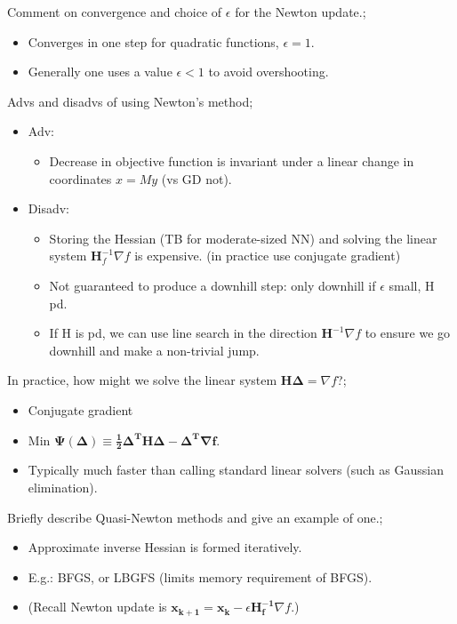 \documentclass{article}
\begin{document}
Comment on convergence and choice of $\epsilon$ for the Newton update.; \begin{itemize} \item Converges in one step for quadratic functions, $\epsilon = 1$.  \item Generally one uses a value $\epsilon < 1$ to avoid overshooting.  \end{itemize}

Advs and disadvs of using Newton's method; \begin{itemize} \item Adv: \begin{itemize} \item Decrease in objective function is invariant under a linear change in coordinates $x=My$ (vs GD not).  \end{itemize} \item Disadv: \begin{itemize} \item Storing the Hessian (TB for moderate-sized NN) and solving the linear system $\mathbf{H}_f^{-1}\nabla f$ is expensive. (in practice use conjugate gradient) \item Not guaranteed to produce a downhill step: only downhill if $\epsilon$ small, H pd.  \item If H is pd, we can use line search in the direction $\mathbf{H}^{-1}\nabla f$ to ensure we go downhill and make a non-trivial jump.  \end{itemize} \end{itemize}

In practice, how might we solve the linear system $\mathbf{H\Delta}=\nabla f$?; \begin{itemize} \item Conjugate gradient \item Min $\mathbf{\Psi(\Delta)\equiv \frac{1}{2}\Delta^TH\Delta -\Delta^T\nabla f}$.  \item Typically much faster than calling standard linear solvers (such as Gaussian elimination).  \end{itemize}

Briefly describe Quasi-Newton methods and give an example of one.; \begin{itemize} \item Approximate inverse Hessian is formed iteratively.  \item E.g.: BFGS, or LBGFS (limits memory requirement of BFGS).  \item (Recall Newton update is $\mathbf{x_{k+1} = x_k} - \epsilon\mathbf{H^{-1}_f}\nabla f$.) \end{itemize}
\end{document}

